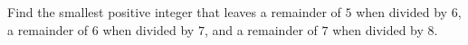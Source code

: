 Find the smallest positive integer that leaves a remainder of $5$ when divided by $6$, a remainder of $6$ when divided by $7$, and a remainder of $7$ when divided by $8$.
